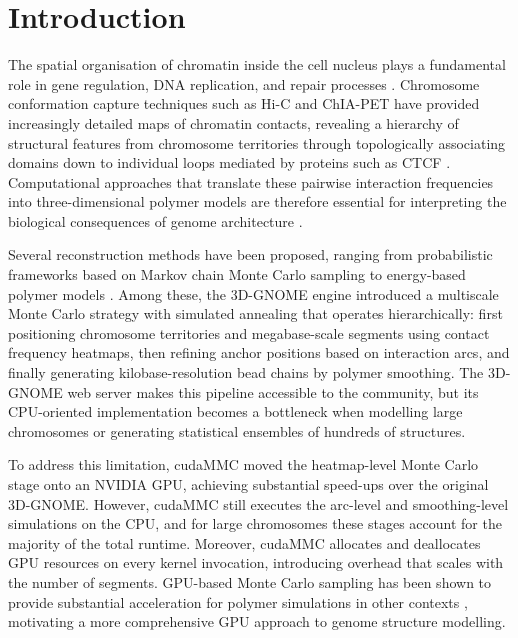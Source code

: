 \documentclass[webpdf,traditional,large]{oup-authoring-template}%
\begin{document}
\section{Introduction}

The spatial organisation of chromatin inside the cell nucleus plays a fundamental role in gene regulation, DNA replication, and repair processes \citep{Szalaj2018organization}. Chromosome conformation capture techniques such as Hi-C and ChIA-PET have provided increasingly detailed maps of chromatin contacts, revealing a hierarchy of structural features from chromosome territories through topologically associating domains down to individual loops mediated by proteins such as CTCF \citep{Fudenberg2016loop, Nuebler2018chromatin}. Computational approaches that translate these pairwise interaction frequencies into three-dimensional polymer models are therefore essential for interpreting the biological consequences of genome architecture \citep{Chiariello2016polymer, Tjong2016population}.

Several reconstruction methods have been proposed, ranging from probabilistic frameworks based on Markov chain Monte Carlo sampling \citep{Rousseau2011chromatin} to energy-based polymer models \citep{Korsak2024multimm, Korsak2024loopsage}. Among these, the 3D-GNOME engine \citep{Szalaj2016engine} introduced a multiscale Monte Carlo strategy with simulated annealing that operates hierarchically: first positioning chromosome territories and megabase-scale segments using contact frequency heatmaps, then refining anchor positions based on interaction arcs, and finally generating kilobase-resolution bead chains by polymer smoothing. The 3D-GNOME web server \citep{Szalaj2016gnome, Wlasnowolski2023gnome} makes this pipeline accessible to the community, but its CPU-oriented implementation becomes a bottleneck when modelling large chromosomes or generating statistical ensembles of hundreds of structures.

To address this limitation, cudaMMC \citep{Wlasnowolski2023cudammc} moved the heatmap-level Monte Carlo stage onto an NVIDIA GPU, achieving substantial speed-ups over the original 3D-GNOME. However, cudaMMC still executes the arc-level and smoothing-level simulations on the CPU, and for large chromosomes these stages account for the majority of the total runtime. Moreover, cudaMMC allocates and deallocates GPU resources on every kernel invocation, introducing overhead that scales with the number of segments. GPU-based Monte Carlo sampling has been shown to provide substantial acceleration for polymer simulations in other contexts \citep{Lee2010gpu, Gross2011parallel}, motivating a more comprehensive GPU approach to genome structure modelling.
\end{document}
